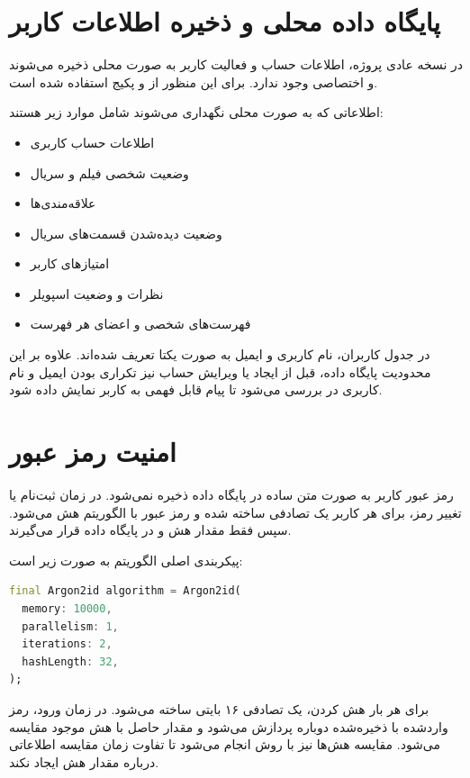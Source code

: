 \documentclass[a4paper,14pt]{extarticle}
\begin{document}
\section*{پایگاه داده محلی و ذخیره اطلاعات کاربر}

در نسخه عادی پروژه، اطلاعات حساب و فعالیت کاربر به صورت محلی ذخیره می‌شوند و  اختصاصی وجود ندارد. برای این منظور از  و پکیج  استفاده شده است.

اطلاعاتی که به صورت محلی نگهداری می‌شوند شامل موارد زیر هستند:

\begin{itemize}
    \item اطلاعات حساب کاربری
    \item وضعیت شخصی فیلم و سریال
    \item علاقه‌مندی‌ها
    \item وضعیت دیده‌شدن قسمت‌های سریال
    \item امتیازهای کاربر
    \item نظرات و وضعیت اسپویلر
    \item فهرست‌های شخصی و اعضای هر فهرست
\end{itemize}

در جدول کاربران، نام کاربری و ایمیل به صورت یکتا تعریف شده‌اند. علاوه بر این محدودیت پایگاه داده، قبل از ایجاد یا ویرایش حساب نیز تکراری بودن ایمیل و نام کاربری در  بررسی می‌شود تا پیام قابل فهمی به کاربر نمایش داده شود.

\section*{امنیت رمز عبور}

رمز عبور کاربر به صورت متن ساده در پایگاه داده ذخیره نمی‌شود. در زمان ثبت‌نام یا تغییر رمز، برای هر کاربر یک  تصادفی ساخته شده و رمز عبور با الگوریتم  هش می‌شود. سپس فقط مقدار هش و  در پایگاه داده قرار می‌گیرند.

پیکربندی اصلی الگوریتم به صورت زیر است:

\begin{latin}
\begin{lstlisting}[style=nice, language=Dart]
final Argon2id algorithm = Argon2id(
  memory: 10000,
  parallelism: 1,
  iterations: 2,
  hashLength: 32,
);
\end{lstlisting}
\end{latin}

برای هر بار هش کردن، یک  تصادفی ۱۶ بایتی ساخته می‌شود. در زمان ورود، رمز واردشده با  ذخیره‌شده دوباره پردازش می‌شود و مقدار حاصل با هش موجود مقایسه می‌شود. مقایسه هش‌ها نیز با روش  انجام می‌شود تا تفاوت زمان مقایسه اطلاعاتی درباره مقدار هش ایجاد نکند.
\end{document}
